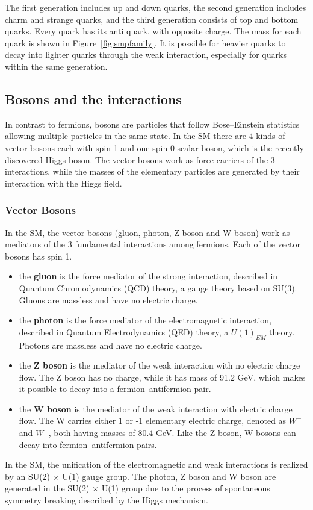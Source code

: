 \vspace{0.3cm}
The first generation includes up and down quarks, the second generation includes charm and strange quarks, and the third generation consists of top and bottom quarks. Every quark has its anti quark, with opposite charge. The mass for each quark is shown in Figure~\ref{fig:smpfamily}. It is possible for heavier quarks to decay into lighter quarks through the weak interaction, especially for quarks within the same generation.
\subsection{Bosons and the interactions}
In contrast to fermions, bosons are particles that follow Bose–Einstein statistics allowing multiple particles in the same state. In the SM there are 4 kinds of vector bosons each with spin 1 and one spin-0 scalar boson, which is the recently discovered Higgs boson. The vector bosons work as force carriers of the 3 interactions, while the masses of the elementary particles are generated by their interaction with the Higgs field.
\subsubsection{Vector Bosons}
In the SM, the vector bosons (gluon, photon, Z boson and W boson) work as mediators of the 3 fundamental interactions among fermions. Each of the vector bosons has spin 1.
\begin{itemize}
\item the \textbf{gluon} is the force mediator of the strong interaction, described in Quantum Chromodynamics (QCD) theory, a gauge theory based on SU(3). Gluons are massless and have no electric charge.
\item the \textbf{photon} is the force mediator of the electromagnetic interaction, described in Quantum Electrodynamics (QED) theory, a $U(1)_{EM}$ theory. Photons are massless and have no electric charge.
\item the \textbf{Z boson} is the mediator of the weak interaction with no electric charge flow. The Z boson has no charge, while it has mass of 91.2 GeV, which makes it possible to decay into a fermion–antifermion pair.
\item the \textbf{W boson} is the mediator of the weak interaction with electric charge flow. The W carries either 1 or -1 elementary electric charge, denoted as $W^{+}$ and $W^{-}$, both having masses of 80.4 GeV. Like the Z boson, W bosons can decay into fermion–antifermion pairs.
\end{itemize}
In the SM, the unification of the electromagnetic and weak interactions is realized by an SU(2) $\times$ U(1) gauge group. The photon, Z boson and W boson are generated in the SU(2) $\times$ U(1) group due to the process of spontaneous symmetry breaking described by the Higgs mechanism. 
